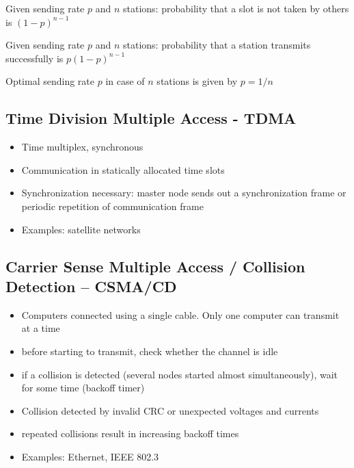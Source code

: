 \begin{theorem}
Given sending rate $p$ and $n$ stations: probability that a slot is not taken by others is $(1-p)^{n-1}$
\end{theorem}

\begin{theorem}
Given sending rate $p$ and $n$ stations: probability that a station transmits successfully is $p(1-p)^{n-1}$
\end{theorem}

\begin{theorem}
Optimal sending rate $p$ in case of $n$ stations is given by $p= 1/n$
\end{theorem}



\subsection{Time Division Multiple Access - TDMA}

\begin{itemize}[noitemsep]
\item Time multiplex, synchronous
\item Communication in statically allocated time slots
\item Synchronization necessary: master node sends out a synchronization frame or periodic repetition of communication frame
\item Examples: satellite networks
\end{itemize}


\subsection{Carrier Sense Multiple Access / Collision Detection -- CSMA/CD}

\begin{itemize}[noitemsep]
\item Computers connected using a single cable. Only one computer can transmit at a time
\item before starting to transmit, check whether the channel is idle
\item if a collision is detected (several nodes started almost 
simultaneously), wait for some time (backoff timer)
\item Collision detected by invalid CRC or unexpected voltages and currents
\item repeated collisions result in increasing backoff times
\item Examples: Ethernet, IEEE 802.3
\end{itemize}

